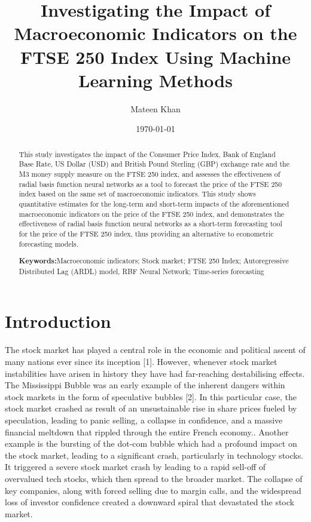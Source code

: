 \documentclass[11pt,a4paper]{article}
\title{Investigating the Impact of Macroeconomic Indicators 
on the FTSE 250 Index Using Machine Learning Methods}
\author{Mateen Khan}
\date{\today}
\providecommand{\keywordname}{\textbf{Keywords:}} %
\newcommand{\keywords}[1]{%
  \par\addvspace{\baselineskip}%
  \noindent\keywordname\enspace\ignorespaces#1 %
}
\begin{document}
\maketitle

\begin{abstract}
    This study investigates the impact of the Consumer Price Index, Bank of England Base Rate, US Dollar (USD) and British Pound Sterling (GBP) exchange rate and the M3 money supply measure on the FTSE 250 index, and assesses the effectiveness of radial basis function neural networks as a tool to forecast the price of the FTSE 250 index based on the same set of macroeconomic indicators. This study shows quantitative estimates for the long-term and short-term impacts of the aforementioned macroeconomic indicators on the price of the FTSE 250 index, and demonstrates the effectiveness of radial basis function neural networks as a short-term forecasting tool for the price of the FTSE 250 index, thus providing an alternative to econometric forecasting models.

    \keywords{Macroeconomic indicators; Stock market; FTSE 250 Index; Autoregressive Distributed Lag
    (ARDL) model, RBF Neural Network; Time-series forecasting}
\end{abstract}

\section{Introduction}

The stock market has played a central role in the economic and political ascent of many nations ever since its inception [1].  However, whenever stock market instabilities have arisen in history they have had far-reaching destabilising effects. The Mississippi Bubble was an early example of the inherent dangers within stock markets in the form of speculative bubbles [2]. In this particular case, the stock market crashed as result of an unsustainable rise in share prices fueled by speculation, leading to panic selling, a collapse in confidence, and a massive financial meltdown that rippled through the entire French economy.. Another example is the bursting of the dot-com bubble which had a profound impact on the stock market, leading to a significant crash, particularly in technology stocks. It triggered a severe stock market crash by leading to a rapid sell-off of overvalued tech stocks, which then spread to the broader market. The collapse of key companies, along with forced selling due to margin calls, and the widespread loss of investor confidence created a downward spiral that devastated the stock market. 
\end{document}
